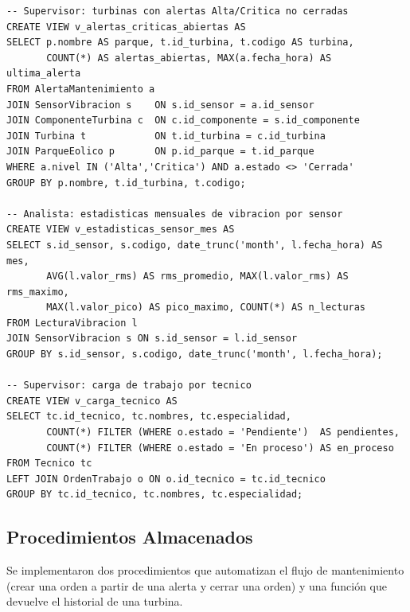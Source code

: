 \documentclass[11pt,a4paper]{article}
\begin{document}
\begin{lstlisting}
-- Supervisor: turbinas con alertas Alta/Critica no cerradas
CREATE VIEW v_alertas_criticas_abiertas AS
SELECT p.nombre AS parque, t.id_turbina, t.codigo AS turbina,
       COUNT(*) AS alertas_abiertas, MAX(a.fecha_hora) AS ultima_alerta
FROM AlertaMantenimiento a
JOIN SensorVibracion s    ON s.id_sensor = a.id_sensor
JOIN ComponenteTurbina c  ON c.id_componente = s.id_componente
JOIN Turbina t            ON t.id_turbina = c.id_turbina
JOIN ParqueEolico p       ON p.id_parque = t.id_parque
WHERE a.nivel IN ('Alta','Critica') AND a.estado <> 'Cerrada'
GROUP BY p.nombre, t.id_turbina, t.codigo;

-- Analista: estadisticas mensuales de vibracion por sensor
CREATE VIEW v_estadisticas_sensor_mes AS
SELECT s.id_sensor, s.codigo, date_trunc('month', l.fecha_hora) AS mes,
       AVG(l.valor_rms) AS rms_promedio, MAX(l.valor_rms) AS rms_maximo,
       MAX(l.valor_pico) AS pico_maximo, COUNT(*) AS n_lecturas
FROM LecturaVibracion l
JOIN SensorVibracion s ON s.id_sensor = l.id_sensor
GROUP BY s.id_sensor, s.codigo, date_trunc('month', l.fecha_hora);

-- Supervisor: carga de trabajo por tecnico
CREATE VIEW v_carga_tecnico AS
SELECT tc.id_tecnico, tc.nombres, tc.especialidad,
       COUNT(*) FILTER (WHERE o.estado = 'Pendiente')  AS pendientes,
       COUNT(*) FILTER (WHERE o.estado = 'En proceso') AS en_proceso
FROM Tecnico tc
LEFT JOIN OrdenTrabajo o ON o.id_tecnico = tc.id_tecnico
GROUP BY tc.id_tecnico, tc.nombres, tc.especialidad;
\end{lstlisting}

\subsection{Procedimientos Almacenados}

Se implementaron dos procedimientos que automatizan el flujo de mantenimiento
(crear una orden a partir de una alerta y cerrar una orden) y una función que
devuelve el historial de una turbina.
\end{document}
